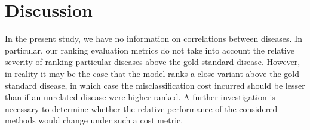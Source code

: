 \section{Discussion}
\label{sec:dis}

In the present study, we have no information on correlations between diseases.
%
In particular, our ranking evaluation metrics do not take into account the
relative severity of ranking particular diseases above the gold-standard disease.
%
However, in reality it may be the case that the model ranks a close variant
above the gold-standard disease, in which case the misclassification cost
incurred should be lesser than if an unrelated disease were higher ranked.
%
A further investigation is necessary to determine whether the relative
performance of the considered methods would change under such a cost metric.


